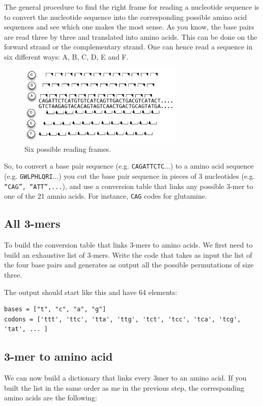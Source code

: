 \documentclass[a4paper,11pt]{article}
\begin{document}
The general procedure to find the right frame for reading a nucleotide sequence is to convert the nucleotide sequence into the corresponding possible amino acid sequences and see which one makes the most sense. As you know, the base pairs are read three by three and translated into amino acids. This can be done on the forward strand or the complementary strand. One can hence read a sequence in six different ways: A, B, C, D, E and F.

\begin{figure}[ht!]
	\centering
	\includegraphics[width=0.7\textwidth]{reading_frame.pdf}
	\caption{Six possible reading frames.}
	\label{fig:gene_distribution_rib}
\end{figure}

So, to convert a base pair sequence (e.g. \texttt{CAGATTCTC}...) to a amino acid sequence (e.g. \texttt{GWLPHLQRI}...) you cut the base pair sequence in pieces of 3 nucleotides (e.g. \texttt{``CAG'', ``ATT'',...}), and use a conversion table that links any possible 3-mer to one of the 21 amnio acids. For instance, \texttt{CAG} codes for glutamine.

\subsection{All 3-mers}
To build the conversion table that links 3-mers to amino acids. We first need to build an exhaustive list of 3-mers. Write the code that takes as input the list of the four base pairs and generates as output all the possible permutations of size three.
	
The output should start like this and have 64 elements:
	
\begin{verbatim}
bases = ["t", "c", "a", "g"]
codons = ['ttt', 'ttc', 'tta', 'ttg', 'tct', 'tcc', 'tca', 'tcg', 'tat', ... ]
\end{verbatim}

\subsection{3-mer to amino acid}
We can now build a dictionary that links every 3mer to an amino acid. If you built the list in the same order as me in the previous step, the corresponding amino acids are the following:
\end{document}
